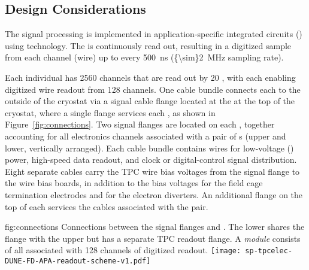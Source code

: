 \subsection{Design Considerations}
\label{sec:fdsp-tpcelec-overview-design}

The  signal processing is implemented in application-specific integrated circuits ()
using  technology.  The  is continuously read out, resulting in a digitized 
sample from each  channel (wire) up to every \SI{500}{ns} (\SI{{\sim}2}{MHz} sampling rate).

Each individual  has \num{2560} channels that are read out by \num{20} , with
each  enabling digitized wire readout from \num{128} channels.  One cable bundle connects each  to
the outside of the cryostat via a  signal cable flange located at the  \fdth at the
top of the cryostat, where a single flange services each , as shown in Figure~\ref{fig:connections}.  Two  signal flanges are located on each \fdth, together accounting for all electronics channels associated with a pair of s (upper and lower, vertically arranged).
Each cable bundle contains wires for low-voltage () power, high-speed data readout, and
clock or digital-control signal distribution.  Eight separate cables carry the TPC wire bias voltages
from the signal flange to the  wire bias boards, in addition to the bias voltages for the field
cage termination electrodes and for the electron diverters.  An additional flange on the top of each \fdth services the  cables associated with the  pair.

\begin{dunefigure}
{fig:connections}
{Connections between the signal flanges and . The lower  shares the  flange with the upper  but has a separate TPC readout flange. A \textit{ module} consists of all  associated with \num{128} channels of digitized readout.}
\texttt{[image: sp-tpcelec-DUNE-FD-APA-readout-scheme-v1.pdf]}
\end{dunefigure}

